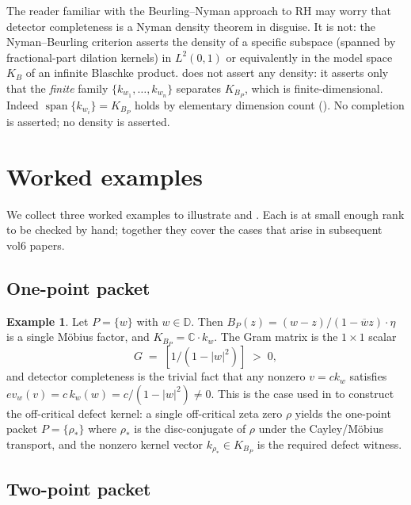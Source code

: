 \documentclass[12pt]{article}
\theoremstyle{definition}
\newtheorem{example}[theorem]{Example}
\theoremstyle{remark}
\newcommand{\C}{\mathbb{C}}
\newcommand{\D}{\mathbb{D}}
\newcommand{\KB}{K_{B}}
\newcommand{\KBP}{K_{B_{P}}}
\newcommand{\abs}[1]{\lvert #1 \rvert}
\newcommand{\conj}[1]{\overline{#1}}
\DeclareMathOperator{\span}{span}
\begin{document}
The reader familiar with the Beurling--Nyman approach to RH may worry that
detector completeness is a Nyman density theorem in disguise. It is not:
the Nyman--Beurling criterion asserts the density of a specific subspace
(spanned by fractional-part dilation kernels) in $L^{2}(0,1)$ or
equivalently in the model space $\KB$ of an infinite Blaschke product.
 does not assert any density: it asserts only
that the \emph{finite} family $\{k_{w_{1}},\dots,k_{w_{n}}\}$ separates
$\KBP$, which is finite-dimensional. Indeed
$\span\{k_{w_{i}}\}=\KBP$ holds by elementary dimension count
(). No completion is asserted; no density is
asserted.

\section{Worked examples}\label{sec:examples}

We collect three worked examples to illustrate  and
. Each is at small enough rank to be checked
by hand; together they cover the cases that arise in subsequent vol6
papers.

\subsection{One-point packet}

\begin{example}\label{ex:single}
Let $P=\{w\}$ with $w\in\D$. Then
$B_{P}(z)=(w-z)/(1-\conj{w}z)\cdot\eta$ is a single Möbius factor, and
$\KBP=\C\cdot k_{w}$. The Gram matrix is the $1\times1$ scalar
\[
  G\;=\;[1/(1-\abs{w}^{2})]\;>\;0,
\]
and detector completeness is the trivial fact that any nonzero
$v=ck_{w}$ satisfies $ev_{w}(v)=c\,k_{w}(w)=c/(1-\abs{w}^{2})\neq0$.
This is the case used in \cite[Paper~03]{Vol6KB} to construct the
off-critical defect kernel: a single off-critical zeta zero $\rho$
yields the one-point packet $P=\{\rho_{*}\}$ where $\rho_{*}$ is the
disc-conjugate of $\rho$ under the Cayley/Möbius transport, and the
nonzero kernel vector $k_{\rho_{*}}\in\KBP$ is the required defect
witness.
\end{example}

\subsection{Two-point packet}
\end{document}

